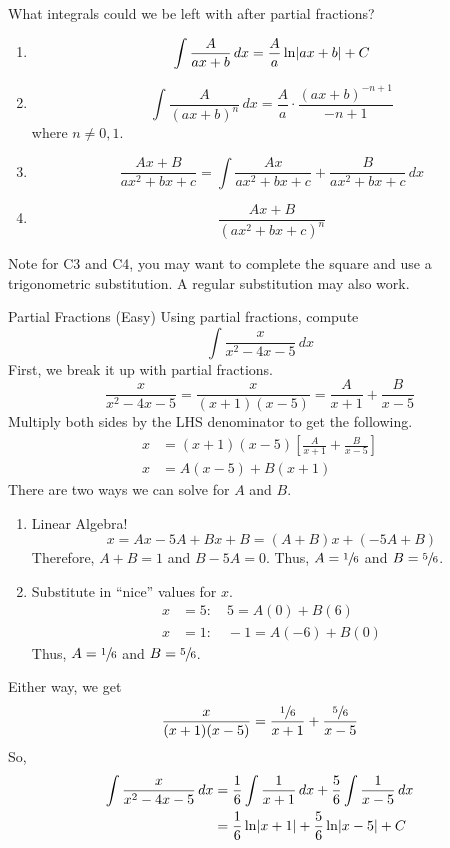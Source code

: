 \begin{Remark}{What integrals could we be left with after partial fractions?}{}
    \begin{enumerate}[label=C\arabic*]
        \item \[ \int \frac{A}{ax+b} \, d{x} =\frac{A}{a}\ln\lvert ax+b\rvert+C \]
        \item \[ \int \frac{A}{(ax+b)^n} \, d{x} =\frac{A}{a}\cdot \frac{(ax+b)^{-n+1}}{-n+1} \]
              where $ n\neq 0,1 $.
        \item \[ \frac{Ax+B}{ax^2+bx+c} =\int \frac{Ax}{ax^2+bx+c} +\frac{B}{ax^2+bx+c} \, d{x}  \]
        \item \[ \frac{Ax+B}{\left( ax^2+bx+c \right)^n} \]
    \end{enumerate}
    Note for C3 and C4, you may want to complete the square and use a trigonometric
    substitution. A regular substitution may also work.
\end{Remark}

\begin{Example}{Partial Fractions (Easy)}{}
    Using partial fractions, compute
    \[ \int \frac{x}{x^2-4x-5} \, d{x} \]
    First, we break it up with partial fractions.
    \[ \frac{x}{x^2-4x-5} =\frac{x}{(x+1)(x-5)}=\frac{A}{x+1} +\frac{B}{x-5} \]
    Multiply both sides by the LHS denominator to get the following.
    \begin{align*}
        x & =(x+1)(x-5)\left[ \frac{A}{x+1} +\frac{B}{x-5}  \right] \\
        x & =A(x-5)+B(x+1)
    \end{align*}
    There are two ways we can solve for $ A $ and $ B $.
    \begin{enumerate}[label=(\roman*)]
        \item Linear Algebra!
              \[ x=Ax-5A+Bx+B=(A+B)x+(-5A+B) \]
              Therefore, $ A+B = 1 $ and $ B-5A=0 $. Thus, $ A=\sfrac{1}{6} $
              and $ B=\sfrac{5}{6} $.
        \item Substitute in ``nice'' values for $ x $.
              \begin{align*}
                  x & =5\colon \quad 5   =A(0)+B(6)  \\
                  x & =1\colon \quad -1  =A(-6)+B(0)
              \end{align*}
              Thus, $ A=\sfrac{1}{6} $ and $ B=\sfrac{5}{6} $.
    \end{enumerate}
    Either way, we get
    \[ \frac{x}{(x+1)(x-5)}=\frac{\sfrac{1}{6}}{x+1}+\frac{\sfrac{5}{6}}{x-5}  \]
    So,
    \begin{align*}
        \int \frac{x}{x^2-4x-5}\, d{x}
         & =\frac{1}{6} \int \frac{1}{x+1}\, d{x} +\frac{5}{6} \int \frac{1}{x-5} \, d{x} \\
         & =\frac{1}{6} \ln\lvert x+1\rvert+\frac{5}{6} \ln\lvert x-5\rvert+C
    \end{align*}
\end{Example}


